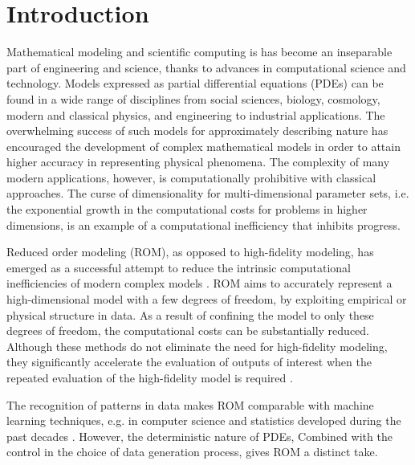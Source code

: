 \chapter{Introduction}
Mathematical modeling and scientific computing is has become an inseparable part of engineering and science, thanks to advances in computational science and technology. Models expressed as partial differential equations (PDEs) can be found in a wide range of disciplines from social sciences, biology, cosmology, modern and classical physics, and engineering to industrial applications. The overwhelming success of such models for approximately describing nature has encouraged the development of complex mathematical models in order to attain higher accuracy in representing physical phenomena. The complexity of many modern applications, however, is computationally prohibitive with classical approaches. The curse of dimensionality for multi-dimensional parameter sets, i.e. the exponential growth in the computational costs for problems in higher dimensions, is an example of a computational inefficiency that inhibits progress.

Reduced order modeling (ROM), as opposed to high-fidelity modeling, has emerged as a successful attempt to reduce the intrinsic computational inefficiencies of modern complex models \cite{hesthaven2015certified,quarteroni2015reduced,doi:10.1137/1.9781611974829,doi:10.1137/1.9780898718713}. ROM aims to accurately represent a high-dimensional model with a few degrees of freedom, by exploiting empirical or physical structure in data. As a result of confining the model to only these degrees of freedom, the computational costs can be substantially reduced. Although these methods do not eliminate the need for high-fidelity modeling, they significantly accelerate the evaluation of outputs of interest when the repeated evaluation of the high-fidelity model is required \cite{hesthaven2015certified}.


The recognition of patterns in data makes ROM comparable with machine learning techniques, e.g. in computer science and statistics developed during the past decades \cite{machinelearning}. However, the deterministic nature of PDEs, Combined with the control in the choice of data generation process, gives ROM a distinct take. 

